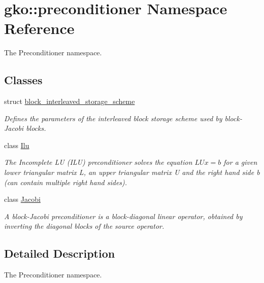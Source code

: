 \hypertarget{namespacegko_1_1preconditioner}{}\section{gko\+:\+:preconditioner Namespace Reference}
\label{namespacegko_1_1preconditioner}


The Preconditioner namespace.  


\subsection*{Classes}
\begin{DoxyCompactItemize}
\item 
struct \hyperlink{structgko_1_1preconditioner_1_1block__interleaved__storage__scheme}{block\+\_\+interleaved\+\_\+storage\+\_\+scheme}
\begin{DoxyCompactList}\small\item\em Defines the parameters of the interleaved block storage scheme used by block-\/\+Jacobi blocks. \end{DoxyCompactList}\item 
class \hyperlink{classgko_1_1preconditioner_1_1Ilu}{Ilu}
\begin{DoxyCompactList}\small\item\em The Incomplete LU (I\+LU) preconditioner solves the equation $LUx = b$ for a given lower triangular matrix L, an upper triangular matrix U and the right hand side b (can contain multiple right hand sides). \end{DoxyCompactList}\item 
class \hyperlink{classgko_1_1preconditioner_1_1Jacobi}{Jacobi}
\begin{DoxyCompactList}\small\item\em A block-\/\+Jacobi preconditioner is a block-\/diagonal linear operator, obtained by inverting the diagonal blocks of the source operator. \end{DoxyCompactList}\end{DoxyCompactItemize}


\subsection{Detailed Description}
The Preconditioner namespace. 